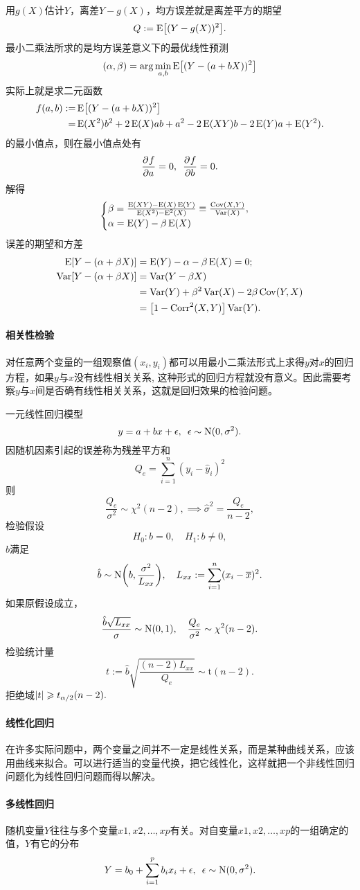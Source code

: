 用$g(X)$估计$Y$，离差$Y-g(X)$，均方误差就是离差平方的期望
\[
	Q:=\operatorname{E}\bigl[(Y-g(X))^2\bigr].
\]
最小二乘法所求的是均方误差意义下的最优线性预测
\[
	(\alpha,\beta)=\arg\min_{a,b}\operatorname{E}\bigl[(Y-(a+bX))^2\bigr]
\]
实际上就是求二元函数
\begin{align*}
	f(a,b):=&{}\operatorname{E}\bigl[(Y-(a+bX))^2\bigr]\\
	=&{}\operatorname{E}(X^2)b^2+2\operatorname{E}(X)ab+a^2-2\operatorname{E}(XY)b-2\operatorname{E}(Y)a+\operatorname{E}(Y^2).
\end{align*}
的最小值点，则在最小值点处有
\[
	\frac{\partial^{{}}f}{\partial{a}^{{}}}=0,\enspace\frac{\partial^{{}}f}{\partial{b}^{{}}}=0.
\]
解得
\begin{equation}
	\begin{cases}
		\beta=\frac{\operatorname{E}(XY)-\operatorname{E}(X)\operatorname{E}(Y)}{\operatorname{E}(X^2)-\operatorname{E}^2(X)}\equiv\frac{\operatorname{Cov}(X,Y)}{\operatorname{Var}(X)},\\
		\alpha=\operatorname{E}(Y)-\beta\operatorname{E}(X)
	\end{cases}
\end{equation}
误差的期望和方差
\begin{align*}
	\E[Y-(\alpha+\beta X)]&=\E(Y)-\alpha-\beta\E(X)=0;\\
	\Var[Y-(\alpha+\beta X)]&=\Var(Y-\beta X)\\
	&=\Var(Y)+\beta^2\Var(X)-2\beta\Cov(Y,X)\\
	&=%
	\bigfkh{1-\Corr^2(X,Y)}\Var(Y).
\end{align*}
\paragraph{相关性检验}
对任意两个变量的一组观察值$ {(x_i, y_i)} $都可以用最小二乘法形式上求得$ y$对$ x $的回归方程，如果$ y $与$ x $没有线性相关关系, 这种形式的回归方程就没有意义。因此需要考察$ y $与$ x $间是否确有线性相关关系，这就是回归效果的检验问题。

一元线性回归模型
\[
	y=a+bx+\epsilon,\enspace\epsilon\sim\operatorname{N}(0,\sigma^2).
\]
因随机因素引起的误差称为残差平方和
\[
	Q_e=\sum_{i=1}^n(y_i-\hat y_i)^2
\]
则
\[
	\frac{Q_e}{\sigma^2}\sim\chi^2(n-2),\implies\hat\sigma^2=\frac{Q_e}{n-2},
\]
检验假设 
\[
	H_0:b=0,\quad H_1:b\neq 0,
\]
$\hat b$满足 
\[
	\hat b\sim\operatorname{N}\biggl(b,\frac{\sigma^2}{L_{xx}}\biggr),\quad L_{xx}:=\sum_{i=1}^n(x_i-\overline{x})^2.
\]
如果原假设成立，
\[
	\frac{\hat b\sqrt{L_{xx}}}{\sigma}\sim\operatorname{N}(0,1),\quad\frac{Q_e}{\sigma^2}\sim\chi^2(n-2).
\]
检验统计量 
\begin{equation}
	t:=\hat b\sqrt{\frac{(n-2)L_{xx}}{Q_e}}\sim\mathrm t(n-2).
\end{equation}
拒绝域$\left\lvert t\right\rvert\geqslant t_{\alpha/2}(n-2).$
\paragraph{线性化回归}
在许多实际问题中，两个变量之间并不一定是线性关系，而是某种曲线关系，应该用曲线来拟合。可以进行适当的变量代换，把它线性化，这样就把一个非线性回归问题化为线性回归问题而得以解决。
\paragraph{多线性回归}
随机变量$ Y $往往与多个变量$ x1, x2, \ldots , xp $有关。对自变量$ x1, x2, \ldots, xp $的一组确定的值，$Y $有它的分布
\[
	Y=b_0+\sum_{i=1}^pb_ix_i+\epsilon,\enspace\epsilon\sim\operatorname{N}(0,\sigma^2).
\]
